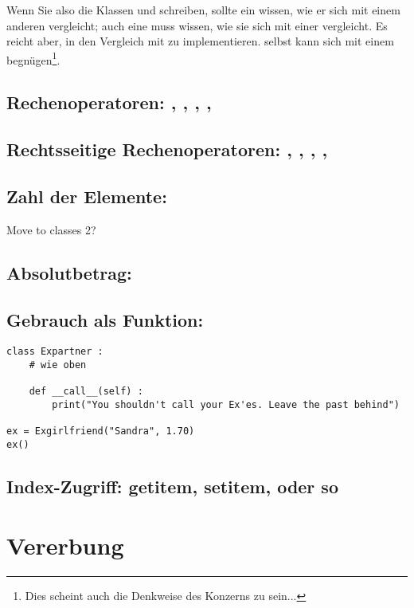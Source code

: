Wenn Sie also die Klassen  und  schreiben, sollte ein  wissen, wie er sich mit einem anderen  vergleicht; auch eine  muss wissen, wie sie sich mit einer  vergleicht. Es reicht aber, in  den Vergleich mit  zu implementieren.  selbst kann sich mit einem  begnügen\footnote{Dies scheint auch die Denkweise des Konzerns zu sein...}.


\subsection{Rechenoperatoren: , , , , }
\subsection{Rechtsseitige Rechenoperatoren: , , , , }
\subsection{Zahl der Elemente: }
Move to classes 2?
\subsection{Absolutbetrag: }
\subsection{Gebrauch als Funktion: }
\begin{codebox}
\begin{verbatim}
class Expartner :
    # wie oben
    
    def __call__(self) :
        print("You shouldn't call your Ex'es. Leave the past behind")

ex = Exgirlfriend("Sandra", 1.70)
ex()
\end{verbatim}
\end{codebox}
\subsection{Index-Zugriff: getitem, setitem, oder so}


\section{Vererbung}
\label{sec:Inheritance}

